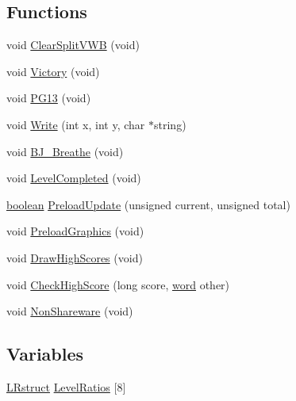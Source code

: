 \subsection*{Functions}
\begin{DoxyCompactItemize}
\item 
void \hyperlink{WL__INTER_8C_a8805b889a7e1284ca6c88619137588d3}{ClearSplitVWB} (void)
\item 
void \hyperlink{WL__INTER_8C_aaa41fd21f2b55e23622375ac43624b99}{Victory} (void)
\item 
void \hyperlink{WL__INTER_8C_af2a55f58d44dd0a7745407495a1ac819}{PG13} (void)
\item 
void \hyperlink{WL__INTER_8C_a2a840b71aa584f6332da78f4eeec8767}{Write} (int x, int y, char $\ast$string)
\item 
void \hyperlink{WL__INTER_8C_afa3cce805f1be8492753978e33f016fb}{BJ\_\-Breathe} (void)
\item 
void \hyperlink{WL__INTER_8C_ab396c53c02f20e288d2d718c0ee64728}{LevelCompleted} (void)
\item 
\hyperlink{ID__HEAD_8H_a7c6368b321bd9acd0149b030bb8275ed}{boolean} \hyperlink{WL__INTER_8C_a9c6d8dd07b26f9e832dfafded62b779c}{PreloadUpdate} (unsigned current, unsigned total)
\item 
void \hyperlink{WL__INTER_8C_a62b222f44bcc97cfca512fe6b24f4863}{PreloadGraphics} (void)
\item 
void \hyperlink{WL__INTER_8C_a249116c49fb1a498be1ac71aac320343}{DrawHighScores} (void)
\item 
void \hyperlink{WL__INTER_8C_ab41d5a4fd5a76f25d8773cff34929243}{CheckHighScore} (long score, \hyperlink{ID__HEAD_8H_abad51e07ab6d26bec9f1f786c8d65bcd}{word} other)
\item 
void \hyperlink{WL__INTER_8C_aa6b18519250a34e966e6900c6328008b}{NonShareware} (void)
\end{DoxyCompactItemize}
\subsection*{Variables}
\begin{DoxyCompactItemize}
\item 
\hyperlink{structLRstruct}{LRstruct} \hyperlink{WL__INTER_8C_a38e5edee41d32a1fe1b993d9246fc74d}{LevelRatios} \mbox{[}8\mbox{]}
\end{DoxyCompactItemize}


